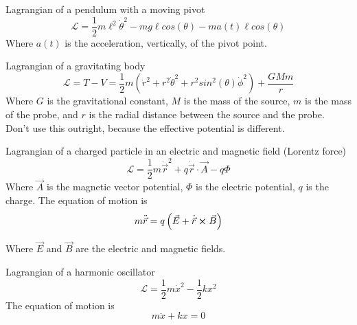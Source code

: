\documentclass[12pt]{article}
\begin{document}
    Lagrangian of a pendulum with a moving pivot
    \[
        \mathcal{L} = \frac{1}{2} m \ell^2 \dot{\theta}^2 - m g \ell cos(\theta) - m a(t) \ell cos(\theta)
    \]
    Where $a(t)$ is the acceleration, vertically, of the pivot point.
    
    Lagrangian of a gravitating body
    \[
        \mathcal{L} = T - V = \frac{1}{2} m \left(\dot{r}^2 + r^2 \dot{\theta}^2 + r^2 sin^2(\theta) \dot{\phi}^2 \right) + \frac{G M m}{r}
    \]
    Where $G$ is the gravitational constant, $M$ is the mass of the source, $m$ is the mass of the probe, and $r$ is the radial distance between the source and the probe. Don't use this outright, because the effective potential is different. 

    Lagrangian of a charged particle in an electric and magnetic field (Lorentz force)
    \[
        \mathcal{L} = \frac{1}{2} m \dot{\vec{r}}^2 + q \dot{\vec{r}} \cdot \vec{A} - q \Phi
    \]
    Where $\vec{A}$ is the magnetic vector potential, $\Phi$ is the electric potential, $q$ is the charge. The equation of motion is
    \[
        m \ddot{\vec{r}} = q \left( \vec{E} + \dot{\vec{r}} \cross \vec{B} \right)
    \]

    
    Where $\vec{E}$ and $\vec{B}$ are the electric and magnetic fields. 

    Lagrangian of a harmonic oscillator
    \[
        \mathcal{L} = \frac{1}{2} m \dot{x}^2 - \frac{1}{2} k x^2
    \]
    The equation of motion is 
    \[
        m \ddot{x} + k x = 0
    \]
    
\end{document}
